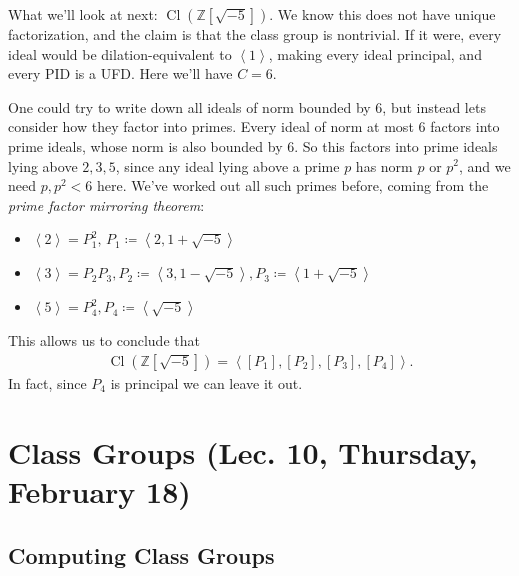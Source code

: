 \begin{example}[?]

What we'll look at next:
\({ \operatorname{Cl}} ( {\mathbb{Z}}[ \sqrt{-5} ])\). We know this does
not have unique factorization, and the claim is that the class group is
nontrivial. If it were, every ideal would be dilation-equivalent to
\(\left\langle{ 1 }\right\rangle\), making every ideal principal, and
every PID is a UFD. Here we'll have \(C=6\).

\hfill\break

One could try to write down all ideals of norm bounded by 6, but instead
lets consider how they factor into primes. Every ideal of norm at most 6
factors into prime ideals, whose norm is also bounded by 6. So this
factors into prime ideals lying above \(2,3,5\), since any ideal lying
above a prime \(p\) has norm \(p\) or \(p^2\), and we need
\(p, p^2 < 6\) here. We've worked out all such primes before, coming
from the \emph{prime factor mirroring theorem}:

\begin{itemize}
\tightlist
\item
  \(\left\langle{ 2 }\right\rangle= P_1^2,\, P_1 \coloneqq\left\langle{ 2, 1 + \sqrt{-5} }\right\rangle\)
\item
  \(\left\langle{ 3 }\right\rangle = P_2 P_3, P_2 \coloneqq\left\langle{ 3, 1 - \sqrt{-5} }\right\rangle, P_3 \coloneqq\left\langle{ 1 + \sqrt{-5} }\right\rangle\)
\item
  \(\left\langle{ 5 }\right\rangle= P_4^2, P_4 \coloneqq\left\langle{ \sqrt{-5} }\right\rangle\)
\end{itemize}

This allows us to conclude that
\begin{align*}
{ \operatorname{Cl}} ({\mathbb{Z}}[ \sqrt{-5} ]) = \left\langle{ [P_1], [P_2], [P_3], [P_4] }\right\rangle
.\end{align*}
In fact, since \(P_4\) is principal we can leave it out.

\end{example}

\hypertarget{class-groups-lec.-10-thursday-february-18}{%
\section{Class Groups (Lec. 10, Thursday, February
18)}\label{class-groups-lec.-10-thursday-february-18}}

\hypertarget{computing-class-groups}{%
\subsection{Computing Class Groups}\label{computing-class-groups}}

